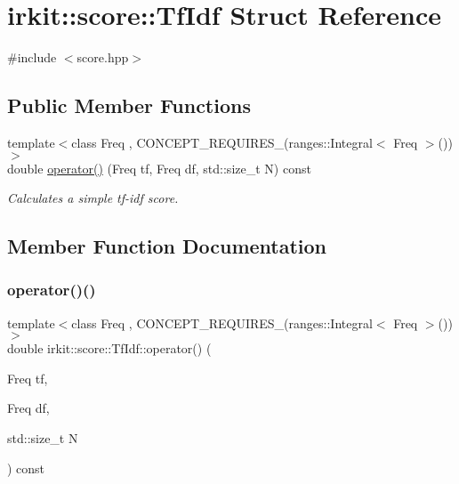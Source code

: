 \hypertarget{structirkit_1_1score_1_1TfIdf}{}\section{irkit\+:\+:score\+:\+:Tf\+Idf Struct Reference}
\label{structirkit_1_1score_1_1TfIdf}


{\ttfamily \#include $<$score.\+hpp$>$}

\subsection*{Public Member Functions}
\begin{DoxyCompactItemize}
\item 
{\footnotesize template$<$class Freq , C\+O\+N\+C\+E\+P\+T\+\_\+\+R\+E\+Q\+U\+I\+R\+E\+S\+\_\+(ranges\+::\+Integral$<$ Freq $>$()) $>$ }\\double \hyperlink{structirkit_1_1score_1_1TfIdf_aec3bfcf0c8c5d174cd8a0af50429f47a}{operator()} (Freq tf, Freq df, std\+::size\+\_\+t N) const
\begin{DoxyCompactList}\small\item\em Calculates a simple tf-\/idf score. \end{DoxyCompactList}\end{DoxyCompactItemize}


\subsection{Member Function Documentation}
\mbox{\label{structirkit_1_1score_1_1TfIdf_aec3bfcf0c8c5d174cd8a0af50429f47a}} 
\subsubsection{\texorpdfstring{operator()()}{operator()()}}
{\footnotesize\ttfamily template$<$class Freq , C\+O\+N\+C\+E\+P\+T\+\_\+\+R\+E\+Q\+U\+I\+R\+E\+S\+\_\+(ranges\+::\+Integral$<$ Freq $>$()) $>$ \\
double irkit\+::score\+::\+Tf\+Idf\+::operator() (\begin{DoxyParamCaption}\item[{Freq}]{tf,  }\item[{Freq}]{df,  }\item[{std\+::size\+\_\+t}]{N }\end{DoxyParamCaption}) const\hspace{0.3cm}{\ttfamily [inline]}}



